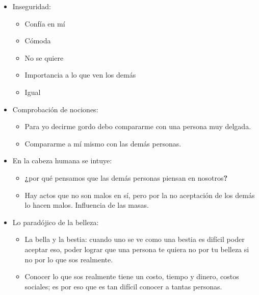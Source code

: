 \begin{itemize}
    \item Inseguridad:
        \begin{itemize}
            \item Confía en mí 
            \item Cómoda 
            \item No se quiere 
            \item Importancia a lo que ven los demás 
            \item Igual 
        \end{itemize}

    
    \item Comprobación de nociones:
        \begin{itemize}
            \item Para yo decirme gordo debo compararme con una persona muy delgada.
            \item Compararme a mí mismo con las demás personas.
        \end{itemize}
    
    \item En la cabeza humana se intuye:
        \begin{itemize}
            \item \textbf{¿}por qué pensamos que las demás personas piensan en nosotros\textbf{?} 
            \item Hay actos que no son malos en sí, pero por la no aceptación de los demás lo hacen malos. Influencia de las masas.
        \end{itemize}
    
    \item Lo paradójico de la belleza:
        \begin{itemize}
            \item La bella y la bestia: cuando uno se ve como una bestia es difícil poder aceptar eso, poder lograr que una persona te quiera no por tu belleza si no por lo que sos realmente.
            \item Conocer lo que sos realmente tiene un costo, tiempo y dinero, costos sociales; es por eso que es tan difícil conocer a tantas personas.
        \end{itemize}
\end{itemize}

